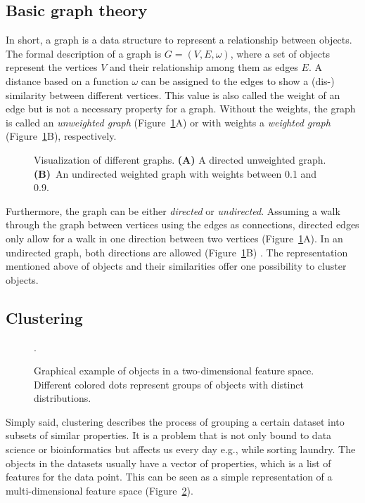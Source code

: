 \documentclass[12pt,a4paper,english]{article}
\begin{document}
\subsection{Basic graph theory}    	
    In short, a graph is a data structure to represent a relationship between objects. The formal description of a graph is $ G = (V, E, \omega) $, where a set of objects represent the vertices $V$ and their relationship among them as edges $E$.
	A distance based on a function $\omega$ can be assigned to the edges to show a (dis-) similarity between different vertices. This value is also called the weight of an edge but is not a necessary property for a graph. Without the weights, the graph is called an \textit{unweighted graph} (Figure~\ref{img:graphs}A) or with weights a \textit{weighted graph} (Figure~\ref{img:graphs}B), respectively.
	\begin{figure}[h]
		\centering
		\def\svgwidth{\textwidth}
		
		\caption[Visualization of different graphs.]{Visualization of different graphs. \textbf{(A)} A directed unweighted graph. \textbf{(B)}~An undirected weighted graph with weights between 0.1 and 0.9.}
		\label{img:graphs}
	\end{figure}
	Furthermore, the graph can be either \textit{directed} or \textit{undirected}. Assuming a walk through the graph between vertices using the edges as connections, directed edges only allow for a walk in one direction between two vertices (Figure~\ref{img:graphs}A). In an undirected graph, both directions are allowed (Figure~\ref{img:graphs}B) \citep{graph-theory:13}.
    The representation mentioned above of objects and their similarities offer one possibility to cluster objects.

\subsection{Clustering}
	\label{ss:clustering}
    \begin{figure}
	\centering
	\def\svgwidth{0.5\textwidth}
	\vspace{-37pt}
	
	\captionsetup{width=.95\linewidth}
	\caption[Graphical example of objects in a two-dimensional feature space.]{Graphical example of objects in a two-dimensional feature space. Different colored dots represent groups of objects with distinct distributions.}.
	\label{img:base_cluster}
	\vspace{-20pt}
	\end{figure}
    Simply said, clustering describes the process of grouping a certain dataset into subsets of similar properties. 
	It is a problem that is not only bound to data science or bioinformatics but affects us every day e.g., while sorting laundry.
	The objects in the datasets usually have a vector of properties, which is a list of features for the data point. This can be seen as a simple representation of a multi-dimensional feature space (Figure~\ref{img:base_cluster}).
	
\end{document}
